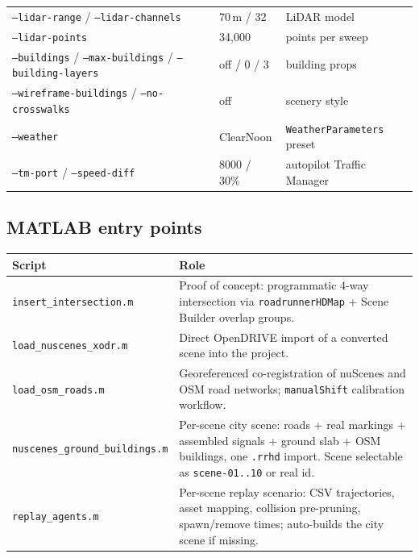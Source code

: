 \documentclass[11pt]{article}
\newcommand{\code}[1]{{\setlength{\fboxsep}{1.5pt}\colorbox{codegray}{\small\texttt{#1}}}}
\newcommand{\file}[1]{\texttt{#1}}
\begin{document}
\begin{center}
\begin{tabular}{@{}lll@{}}
\code{--lidar-range} / \code{--lidar-channels} & 70\,m / 32 & LiDAR model \\
\code{--lidar-points} & 34{,}000 & points per sweep \\
\code{--buildings} / \code{--max-buildings} / \code{--building-layers} & off / 0 / 3 & building props \\
\code{--wireframe-buildings} / \code{--no-crosswalks} & off & scenery style \\
\code{--weather}        & ClearNoon & \code{WeatherParameters} preset \\
\code{--tm-port} / \code{--speed-diff} & 8000 / 30\% & autopilot Traffic Manager \\
\bottomrule
\end{tabular}
\end{center}

\subsection{MATLAB entry points}
\begin{center}
\footnotesize
\begin{tabular}{@{}lp{9.8cm}@{}}
\toprule
\textbf{Script} & \textbf{Role} \\
\midrule
\file{insert\_intersection.m} & Proof of concept: programmatic 4-way intersection via \code{roadrunnerHDMap} + Scene Builder overlap groups. \\
\file{load\_nuscenes\_xodr.m} & Direct OpenDRIVE import of a converted scene into the project. \\
\file{load\_osm\_roads.m} & Georeferenced co-registration of nuScenes and OSM road networks; \code{manualShift} calibration workflow. \\
\file{nuscenes\_ground\_buildings.m} & Per-scene city scene: roads + real markings + assembled signals + ground slab + OSM buildings, one \file{.rrhd} import. Scene selectable as \code{scene-01..10} or real id. \\
\file{replay\_agents.m} & Per-scene replay scenario: CSV trajectories, asset mapping, collision pre-pruning, spawn/remove times; auto-builds the city scene if missing. \\
\bottomrule
\end{tabular}
\end{center}
\end{document}
